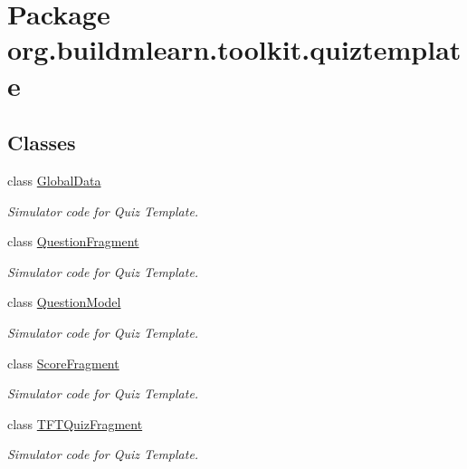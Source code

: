 \hypertarget{namespaceorg_1_1buildmlearn_1_1toolkit_1_1quiztemplate}{\section{Package org.\-buildmlearn.\-toolkit.\-quiztemplate}
\label{namespaceorg_1_1buildmlearn_1_1toolkit_1_1quiztemplate}
}
\subsection*{Classes}
\begin{DoxyCompactItemize}
\item 
class \hyperlink{classorg_1_1buildmlearn_1_1toolkit_1_1quiztemplate_1_1GlobalData}{Global\-Data}
\begin{DoxyCompactList}\small\item\em Simulator code for Quiz Template. \end{DoxyCompactList}\item 
class \hyperlink{classorg_1_1buildmlearn_1_1toolkit_1_1quiztemplate_1_1QuestionFragment}{Question\-Fragment}
\begin{DoxyCompactList}\small\item\em Simulator code for Quiz Template. \end{DoxyCompactList}\item 
class \hyperlink{classorg_1_1buildmlearn_1_1toolkit_1_1quiztemplate_1_1QuestionModel}{Question\-Model}
\begin{DoxyCompactList}\small\item\em Simulator code for Quiz Template. \end{DoxyCompactList}\item 
class \hyperlink{classorg_1_1buildmlearn_1_1toolkit_1_1quiztemplate_1_1ScoreFragment}{Score\-Fragment}
\begin{DoxyCompactList}\small\item\em Simulator code for Quiz Template. \end{DoxyCompactList}\item 
class \hyperlink{classorg_1_1buildmlearn_1_1toolkit_1_1quiztemplate_1_1TFTQuizFragment}{T\-F\-T\-Quiz\-Fragment}
\begin{DoxyCompactList}\small\item\em Simulator code for Quiz Template. \end{DoxyCompactList}\end{DoxyCompactItemize}
